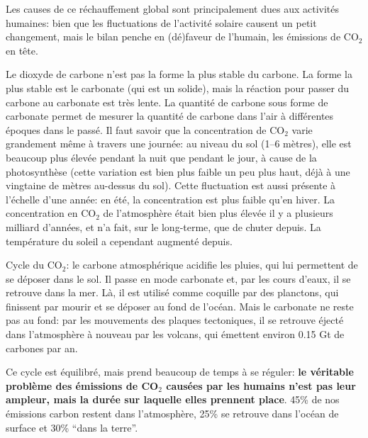 \documentclass{article}
\begin{document}
 Les causes de ce réchauffement global sont principalement dues aux activités humaines: bien que les fluctuations de l'activité solaire causent un petit changement, mais le bilan penche en (dé)faveur de l'humain, les émissions de CO$_2$ en tête. \par
 Le dioxyde de carbone n'est pas la forme la plus stable du carbone. La forme la plus stable est le carbonate (qui est un solide), mais la réaction pour passer du carbone au carbonate est très lente. La quantité de carbone sous forme de carbonate permet de mesurer la quantité de carbone dans l'air à différentes époques dans le passé. Il faut savoir que la concentration de CO$_2$ varie grandement même à travers une journée: au niveau du sol (1--6 mètres), elle est beaucoup plus élevée pendant la nuit que pendant le jour, à cause de la photosynthèse (cette variation est bien plus faible un peu plus haut, déjà à une vingtaine de mètres au-dessus du sol). Cette fluctuation est aussi présente à l'échelle d'une année: en été, la concentration est plus faible qu'en hiver. La concentration en CO$_2$ de l'atmosphère était bien plus élevée il y a plusieurs milliard d'années, et n'a fait, sur le long-terme, que de chuter depuis. La température du soleil a cependant augmenté depuis. \par
 Cycle du CO$_2$: le carbone atmosphérique acidifie les pluies, qui lui permettent de se déposer dans le sol. Il passe en mode carbonate et, par les cours d'eaux, il se retrouve dans la mer. Là, il est utilisé comme coquille par des planctons, qui finissent par mourir et se déposer au fond de l'océan. Mais le carbonate ne reste pas au fond: par les mouvements des plaques tectoniques, il se retrouve éjecté dans l'atmosphère à nouveau par les volcans, qui émettent environ 0.15 Gt de carbones par an. \par
 Ce cycle est équilibré, mais prend beaucoup de temps à se réguler: \textbf{le véritable problème des émissions de CO$_2$ causées par les humains n'est pas leur ampleur, mais la durée sur laquelle elles prennent place}. 45\% de nos émissions carbon restent dans l'atmosphère, 25\% se retrouve dans l'océan de surface et 30\% ``dans la terre''. \par
\end{document}
